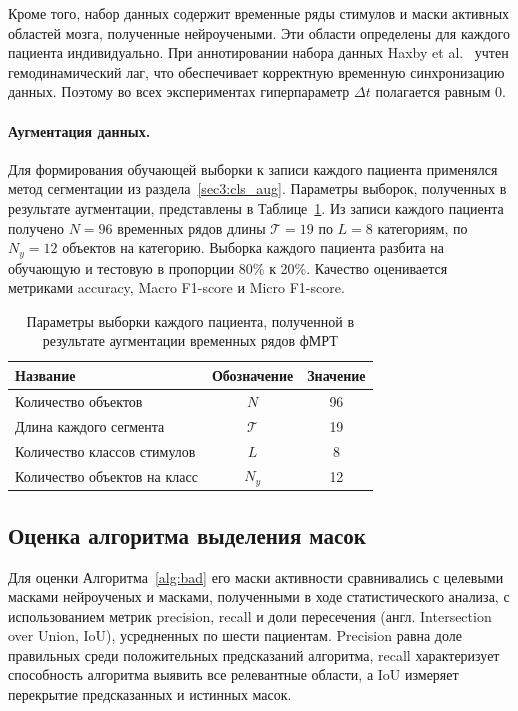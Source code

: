 Кроме того, набор данных содержит временные ряды стимулов и маски активных областей мозга, полученные нейроучеными. Эти области определены для каждого пациента индивидуально. При аннотировании набора данных Haxby et al.~\cite{haxby2001distributed} учтен гемодинамический лаг, что обеспечивает корректную временную синхронизацию данных. Поэтому во всех экспериментах гиперпараметр $\Delta t$ полагается равным $0$.

\paragraph{Аугментация данных.}\label{sec4:cls_aug} Для формирования обучающей выборки к записи каждого пациента применялся метод сегментации из раздела~\ref{sec3:cls_aug}. Параметры выборок, полученных в результате аугментации, представлены в Таблице~\ref{table:cls_augmentation}. Из записи каждого пациента получено $N = 96$ временных рядов длины $\mathcal{T} = 19$ по $L = 8$ категориям, по $N_y = 12$ объектов на категорию. Выборка каждого пациента разбита на обучающую и тестовую в пропорции 80\% к 20\%. Качество оценивается метриками accuracy, Macro F1-score и Micro F1-score.

\begin{table}[h!]
    \centering
    \caption{Параметры выборки каждого пациента, полученной в результате аугментации временных рядов фМРТ}\label{table:cls_augmentation}
    \begin{tabular}{lcc}
        \toprule
        Название & Обозначение & Значение \\
        \midrule
        Количество объектов & $N$ & 96 \\
        Длина каждого сегмента & $\mathcal{T}$ & 19 \\
        Количество классов стимулов & $L$ & 8 \\
        Количество объектов на класс & $N_y$ & 12 \\
        \bottomrule
    \end{tabular}
\end{table}

\subsection{Оценка алгоритма выделения масок}\label{sec4:cls_bad}

Для оценки Алгоритма~\ref{alg:bad} его маски активности сравнивались с целевыми масками нейроученых и масками, полученными в ходе статистического анализа, с использованием метрик precision, recall и доли пересечения (англ. Intersection over Union, IoU), усредненных по шести пациентам. Precision равна доле правильных среди положительных предсказаний алгоритма, recall характеризует способность алгоритма выявить все релевантные области, а IoU измеряет перекрытие предсказанных и истинных масок.

